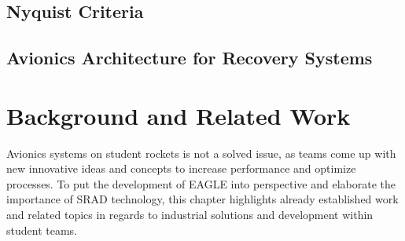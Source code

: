 \documentclass[fontsize=11pt,%
twoside,%
BCOR          = 8mm, %
DIV           = 11,  %
titlepage     = off,%
index=totoc,%
xcolor        = pdftex,%
dvipsnames,%
bibliography  = totoc,%
bibliography = numbered, %
listof        = notnumbered]{scrreprt}
\begin{document}
\section{Nyquist Criteria}


\section{Avionics Architecture for Recovery Systems}

\newpage

\chapter{Background and Related Work}
Avionics systems on student rockets is not a solved issue, as teams come up with new innovative ideas and concepts to increase performance and optimize processes. To put the development of EAGLE into perspective and elaborate the importance of SRAD technology, this chapter highlights already established work and related topics in regards to industrial solutions and development within student teams.
\end{document}
